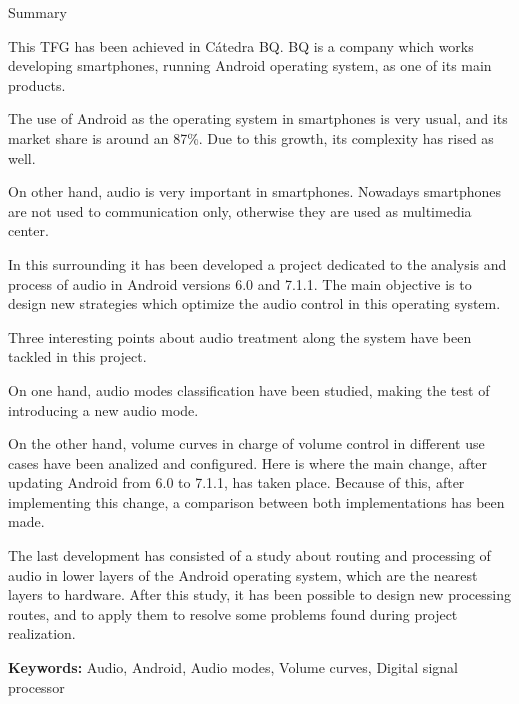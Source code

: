\begin{center}
\Large{Summary}
\end{center}

\bigskip

This \gls{TFG} has been achieved in Cátedra BQ. BQ is a company which works developing smartphones, running Android operating system, as one of its main products.

The use of Android as the operating system in smartphones is very usual, and its market share is around an 87\%. Due to this growth, its complexity has rised as well.

On other hand, audio is very important in smartphones. Nowadays smartphones are not used to communication only, otherwise they are used as multimedia center.

In this surrounding it has been developed a project dedicated to the analysis and process of audio in Android versions 6.0 and 7.1.1. The main objective is to design new strategies which optimize the audio control in this operating system.

Three interesting points about audio treatment along the system have been tackled in this project.

On one hand, audio modes classification have been studied, making the test of introducing a new audio mode.

On the other hand, volume curves in charge of volume control in different use cases have been analized and configured. Here is where the main change, after updating Android from 6.0 to 7.1.1, has taken place. Because of this, after implementing this change, a comparison between both implementations has been made.

The last development has consisted of a study about routing and processing of audio in lower layers of the Android operating system, which are the nearest layers to hardware. After this study, it has been possible to design new processing routes, and to apply them to resolve some problems found during project realization.


\bigskip
\bigskip
\bigskip
\bigskip
\bigskip

\textbf{Keywords:} Audio, Android, Audio modes, Volume curves, Digital signal processor
